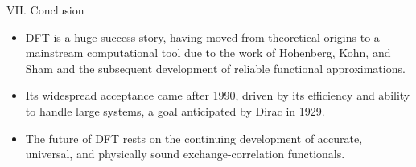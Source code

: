 \begin{frame}{\large VII. Conclusion}
    \begin{itemize}
        \item DFT is a huge success story, having moved from theoretical origins to a mainstream computational tool due to the work of Hohenberg, Kohn, and Sham and the subsequent development of reliable functional approximations.
        \item Its widespread acceptance came after 1990, driven by its efficiency and ability to handle large systems, a goal anticipated by Dirac in 1929.
        \item The future of DFT rests on the continuing development of accurate, universal, and physically sound exchange-correlation functionals.
    \end{itemize}
\end{frame}